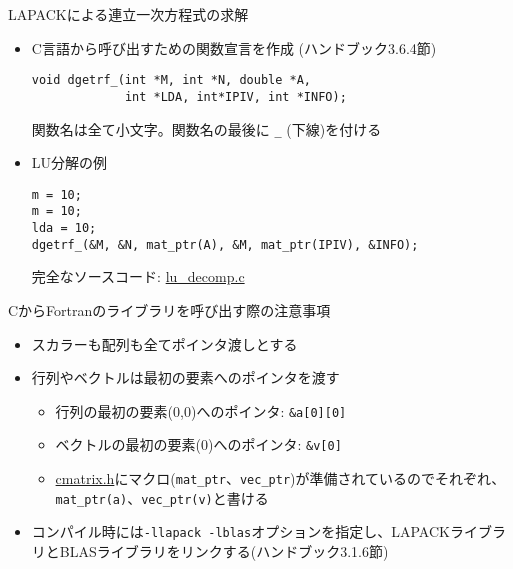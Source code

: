 \begin{frame}[t,fragile]{LAPACKによる連立一次方程式の求解}
  \begin{itemize}
    \setlength{\itemsep}{1em}
  \item C言語から呼び出すための関数宣言を作成 (ハンドブック3.6.4節)
\begin{lstlisting}
void dgetrf_(int *M, int *N, double *A,
             int *LDA, int*IPIV, int *INFO);
\end{lstlisting}
関数名は全て小文字。関数名の最後に {\tt \_} (下線)を付ける
\item LU分解の例
\begin{lstlisting}
m = 10;
m = 10;
lda = 10;
dgetrf_(&M, &N, mat_ptr(A), &M, mat_ptr(IPIV), &INFO);
\end{lstlisting}
完全なソースコード: \href{https://github.com/todo-group/computer-experiments/blob/master/exercise/linear_system/lu_decomp.c}{lu\_decomp.c}
  \end{itemize}
\end{frame}

\begin{frame}[t,fragile]{CからFortranのライブラリを呼び出す際の注意事項}
  \begin{itemize}
    \setlength{\itemsep}{1em}
  \item スカラーも配列も全てポインタ渡しとする
  \item 行列やベクトルは最初の要素へのポインタを渡す
    \begin{itemize}
      \item 行列の最初の要素(0,0)へのポインタ: \verb+&a[0][0]+
      \item ベクトルの最初の要素(0)へのポインタ: \verb+&v[0]+
      \item \href{https://github.com/todo-group/computer-experiments/blob/master/exercise/matrix/cmatrix.h}{cmatrix.h}にマクロ({\tt mat\_ptr}、{\tt vec\_ptr})が準備されているのでそれぞれ、{\tt mat\_ptr(a)}、{\tt vec\_ptr(v)}と書ける
    \end{itemize}
  \item コンパイル時には{\tt -llapack -lblas}オプションを指定し、LAPACKライブラリとBLASライブラリをリンクする(ハンドブック3.1.6節)
  \end{itemize}
\end{frame}
